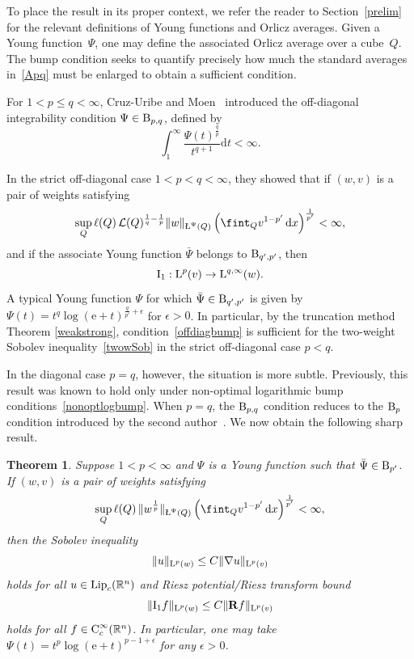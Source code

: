 \documentclass[11pt, a4paper, reqno]{amsart}
\newcommand{\R}{\mathbb R}
\newcommand{\ep}{\epsilon}
\newcommand{\dx}{\,{\mathrm dx}}
\newcommand{\Lup}{\textup{L}}
\newcommand{\Leb}{\mathcal{L}}
\newcommand{\Ldash}{\textup{\L}}
\newcommand{\Con}{\textup{C}}
\DeclareMathOperator{\Lip}{\textup{Lip}}
\newtheorem{theorem}{Theorem}[section]
\theoremstyle{definition}
\theoremstyle{remark}
\begin{document}
To place the result in its proper context, we refer the reader to Section~\ref{prelim} for the relevant definitions of Young functions and Orlicz averages. Given a Young function~$\Psi$, one may define the associated Orlicz average over a cube~$Q$. The bump condition seeks to quantify precisely how much the standard averages in~\eqref{Apq} must be enlarged to obtain a sufficient condition.

For $1<p\le q<\infty$, Cruz-Uribe and Moen~\cite{CM} introduced the off-diagonal integrability condition $\Psi\in \textup B_{p,q}$, defined by
\begin{equation} \label{Bpq}
\int_1^\infty \frac{\Psi(t)^{\frac{q}{p}}}{t^{q+1}}\mathrm dt<\infty.
\end{equation}

In the strict off-diagonal case $1<p<q<\infty$, they showed that if $(w,v)$ is a pair of weights satisfying
\begin{equation}\label{offdiagbump}
\sup_Q \ell(Q)\,\Leb(Q)^{\frac1q-\frac1p}
\|w\|_{\Ldash^\Psi(Q)}
\left(\fint_Q v^{1-p'}\dx\right)^{\frac1{p'}}
<\infty,
\end{equation}
and if the associate Young function $\bar{\Psi}$ belongs to $\textup B_{q',p'}$, then
\[
\textup{I}_1:\Lup^p(v)\to \Lup^{q,\infty}(w).
\]
A typical Young function $\Psi$ for which $\bar{\Psi}\in  \textup B_{q',p'}$ is given by $\Psi(t)=t^q\log(\mathrm e+t)^{\frac{q}{p'}+\ep}$ for $\ep>0$.  In particular, by the truncation method Theorem \ref{weakstrong}, condition~\eqref{offdiagbump} is sufficient for the two-weight Sobolev inequality~\eqref{twowSob} in the strict off-diagonal case $p<q$.

In the diagonal case $p=q$, however, the situation is more subtle. Previously, this result was known to hold only under non-optimal logarithmic bump conditions~\eqref{nonoptlogbump}. When $p=q$, the $\textup B_{p,q}$ condition reduces to the $\textup B_p$ condition introduced by the second author~\cite{Per94}. We now obtain the following sharp result.


\begin{theorem} \label{optimalppbump}
Suppose $1<p<\infty$ and $\Psi$ is a Young function such that $\bar{\Psi}\in \textup B_{p'}$. 
If $(w,v)$ is a pair of weights satisfying
\[
\sup_Q \ell(Q)\,\|w^{\frac1p}\|_{\Ldash^\Psi(Q)}
\left(\fint_Q v^{1-p'}\dx\right)^{\frac1{p'}}<\infty,
\]
then the Sobolev inequality
\[
\|u\|_{\Lup^p(w)}\le C\|\nabla u\|_{\Lup^p(v)}
\]
holds for all $u\in \Lip_c(\R^n)$ and Riesz potential/Riesz transform bound
$$\|\textup{I}_1f\|_{\Lup^p(w)}\le C\|\mathbf R f\|_{\Lup^p(v)}$$
holds for all $f\in \Con_c^\infty(\R^n)$. In particular, one may take $\Psi(t)=t^p\log(\mathrm e+t)^{p-1+\ep}$
for any $\ep>0$.
\end{theorem}
\end{document}

